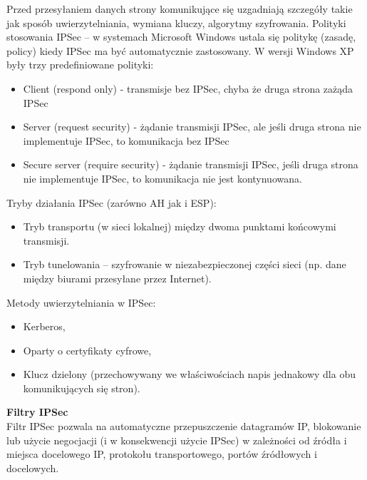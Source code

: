\documentclass[../main.tex]{subfiles}
\begin{document}
Przed przesyłaniem danych strony komunikujące się uzgadniają szczegóły takie jak sposób
uwierzytelniania, wymiana kluczy, algorytmy szyfrowania.
Polityki stosowania IPSec – w systemach Microsoft Windows ustala się politykę (zasadę,
policy) kiedy IPSec ma być automatycznie zastosowany. W wersji Windows XP były trzy
predefiniowane polityki:
\begin{itemize}
    \item Client (respond only) - transmisje bez IPSec, chyba że druga strona zażąda IPSec
    \item Server (request security) - żądanie transmisji IPSec, ale jeśli druga strona nie
    implementuje IPSec, to komunikacja bez IPSec
    \item Secure server (require security) - żądanie transmisji IPSec, jeśli druga strona nie
    implementuje IPSec, to komunikacja nie jest kontynuowana.
\end{itemize}


Tryby działania IPSec (zarówno AH jak i ESP):
\begin{itemize}
    \item Tryb transportu (w sieci lokalnej) między dwoma punktami końcowymi transmisji.
    \item Tryb tunelowania – szyfrowanie w niezabezpieczonej części sieci (np. dane między
    biurami przesyłane przez Internet).
\end{itemize}

Metody uwierzytelniania w IPSec:
\begin{itemize}
    \item Kerberos,
    \item Oparty o certyfikaty cyfrowe,
    \item Klucz dzielony (przechowywany we właściwościach napis jednakowy dla obu
    komunikujących się stron).
\end{itemize}

\textbf{Filtry IPSec}\\
Filtr IPSec pozwala na automatyczne przepuszczenie datagramów IP, blokowanie lub użycie
negocjacji (i w konsekwencji użycie IPSec) w zależności od źródła i miejsca docelowego IP,
protokołu transportowego, portów źródłowych i docelowych.
\end{document}
